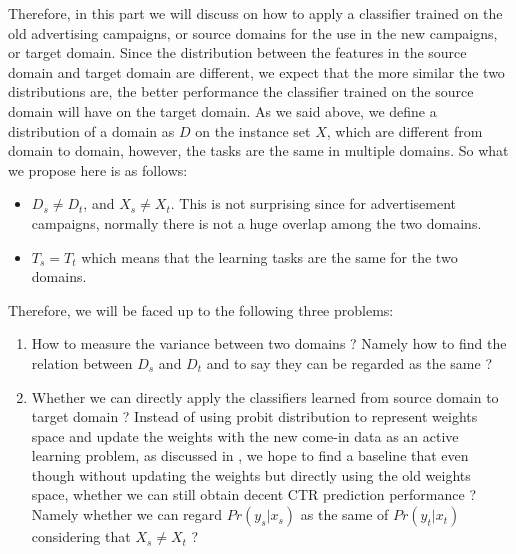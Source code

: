 Therefore, in this part we will discuss on how to apply a classifier trained on the old advertising campaigns, or source domains for the use in the new campaigns, or target domain. Since the distribution between the features in the source domain and target domain are different, we expect that the more similar the two distributions are, the better performance the classifier trained on the source domain will have on the target domain. As we said above, we define a distribution of a domain as \(D\) on the instance set \(X\), which are different from domain to domain, however, the tasks are the same in multiple domains. So what we propose here is as follows:
\begin{itemize}
  \item \(D_s \neq D_t\), and \(X_s \neq X_t\). This is not surprising since for advertisement campaigns, normally there is not a huge overlap among the two domains.  
  \item \(T_s = T_t\) which means that the learning tasks are the same for the two domains.
\end{itemize}
Therefore, we will be faced up to the following three problems:
\begin{enumerate}
  \item How to measure the variance between two domains ? Namely how to find the relation between \(D_s\) and \(D_t\) and to say they can be regarded as the same ?
  \item Whether we can directly apply the classifiers learned from source domain to target domain ? Instead of using probit distribution to represent weights space and update the weights with the new come-in data as an active learning problem, as discussed in \cite{graepel2010web}, we hope to find a baseline that even though without updating the weights but directly using the old weights space, whether we can still obtain decent CTR prediction performance ? Namely whether we can regard \(Pr(y_s|x_s)\) as the same of \(Pr(y_t|x_t)\) considering that \(X_s \neq X_t\) ? 
\end{enumerate}



